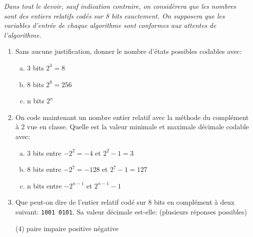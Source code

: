 \documentclass[a4paper,10pt]{report}
\def\ptsexoA{4}
\begin{document}

\renewcommand{\labelitemi}{\textbullet} %


\pagestyle{DS_FP}          %
\NomPrenomNote{}

\emph{Dans tout le devoir, sauf indication contraire, on considèrera que les nombres sont des entiers relatifs codés sur 8 bits exactement. On supposera que les variables d'entrée de chaque algorithme sont conformes aux attentes de l'algorithme.
}

\exods{\ptsexoA}

\begin{enumerate}
    \item Sans aucune justification, donner le nombre d'états possibles codables avec:
    
\begin{enumerate}[a)]
    \item 3 bits \qquad $2^3=8$
    \item 8 bits \qquad $2^8=256$
    \item n bits \qquad $2^n$
\end{enumerate}

\item On code maintenant un nombre entier relatif avec la méthode du complément à 2 vue en classe. Quelle est la valeur minimale et maximale décimale codable avec:

\begin{enumerate}[a)]
    \item 3 bits \qquad entre $-2^2=-4$ et $2^2-1=3$
    \item 8 bits \qquad entre $-2^7=-128$ et $2^7-1=127$
    \item n bits \qquad entre $-2^{n-1}$ et $2^{n-1}-1$
\end{enumerate}

\item Que peut-on dire de l'entier relatif codé sur 8 bits en complément à deux suivant: \verb|1001 0101|. Sa valeur décimale est-elle: (plusieurs réponses possibles)

\begin{tasks}(4)
    \task[$\bigcirc$] paire
    \task[$\bigotimes$] impaire
    \task[$\bigcirc$] positive
    \task[$\bigotimes$] négative
\end{tasks}

\end{enumerate}
\end{document}
